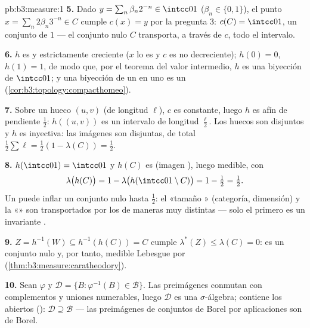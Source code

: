 \begin{solution}{pb:b3:measure:1}
\textbf{5.} Dado $y = \sum_n\beta_n2^{-n} \in \intcc01$
($\beta_n \in \{0,1\}$), el punto $x = \sum_n2\beta_n3^{-n}
\in C$ cumple $c(x) = y$ por la pregunta 3: $c(C) = \intcc01$, un
conjunto de  $1$ --- el conjunto
nulo $C$ transporta, a través de $c$, todo el intervalo.

\textbf{6.} $h$ es  y
estrictamente creciente ($x$ lo es y $c$ es no decreciente); $h(0) = 0$,
$h(1) = 1$, de modo que, por el teorema del valor intermedio, $h$ es una
biyección  de $\intcc01$; y
una biyección  de un
 en uno
 es un
(\cref{cor:b3:topology:compacthomeo}).

\textbf{7.} Sobre un hueco $(u, v)$ (de longitud $\ell$), $c$ es
constante, luego $h$ es afín de pendiente $\frac12$: $h((u,v))$ es un
intervalo de longitud $\frac\ell2$. Los huecos son disjuntos y $h$ es
inyectiva: las imágenes son disjuntas, de
 total
$\frac12\sum\ell = \frac12(1 - \lambda(C)) = \frac12$.

\textbf{8.} $h(\intcc01) = \intcc01$ y $h(C)$ es
 (imagen
), luego medible, con
\[
\lambda\bigl(h(C)\bigr) = 1 -
\lambda\bigl(h(\intcc01\setminus C)\bigr) = 1 - \tfrac12 =
\tfrac12 .
\]
Un  puede inflar un
conjunto nulo hasta  $\frac12$:
el «tamaño » (categoría,
dimensión) y la «» son
transportados por los
 de maneras muy
distintas --- solo el primero es un invariante
.

\textbf{9.} $Z = h^{-1}(W) \subseteq h^{-1}(h(C)) = C$ cumple
$\lambda^*(Z) \leq \lambda(C) = 0$: es un conjunto nulo y, por tanto,
medible Lebesgue por 
(\cref{thm:b3:measure:caratheodory}).

\textbf{10.} Sean $\varphi$
 y $\mathcal D = \{B
: \varphi^{-1}(B) \in \mathcal B\}$. Las preimágenes conmutan con
complementos y uniones numerables, luego $\mathcal D$ es una
$\sigma$-álgebra; contiene los
abiertos
():
$\mathcal D \supseteq \mathcal B$ --- las preimágenes de conjuntos de
Borel por aplicaciones 
son de Borel.


\end{solution}
